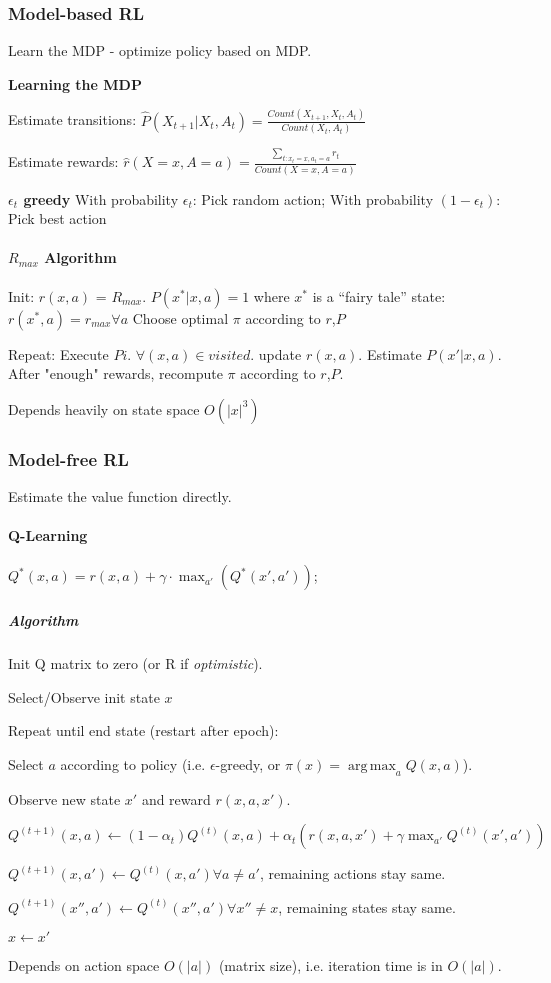 \documentclass[a4paper, 10pt]{scrartcl}
\DeclareMathOperator*{\argmax}{arg\,max}
\begin{document}
\begin{multicols*}{3}
\subsubsection{Model-based RL }
Learn the MDP - optimize policy based on MDP.

\textbf{Learning the MDP}

Estimate transitions: $\hat{P}(X_{t+1} | X_t, A_t) = \frac{Count(X_{t+1}, X_t, A_t)}{Count(X_t, A_t)}$

Estimate rewards: $\hat{r}(X=x, A= a) = \frac{\sum_{t: x_t = x, a_t = a} r_t}{Count(X = x, A = a)}$

\textbf{ $\epsilon_t$ greedy}
With probability  $\epsilon_t$: Pick random action; With probability $(1- \epsilon_t)$: Pick best action

\paragraph{$R_{max}$ Algorithm}
Init: $r(x, a)$ = $R_{max}$.
$P(x^* | x, a) = 1$ where $x^*$ is a “fairy tale” state: $r(x^*, a) = r_{max}  \forall a$
Choose optimal $\pi$ according to $r$,$P$

Repeat:
Execute $Pi$. $\forall(x,a)\in visited$. update $r(x,a)$. Estimate $P(x'|x,a)$.
After "enough" rewards, recompute $\pi$ according to $r$,$P$.

Depends heavily on state space $O(|x|^3)$


\subsubsection{Model-free RL}
Estimate the value function directly.

\paragraph{Q-Learning}
$Q^*(x, a) = r(x, a) + \gamma \cdot \max_{a'} (Q^*(x', a'))$;

\subparagraph{Algorithm} Init Q matrix to zero (or R if \emph{optimistic}).
\begin{compactitem}
	\item Select/Observe init state $x$
	\item Repeat until end state (restart after epoch):
	\item Select $a$ according to policy (i.e. $\epsilon$-greedy, or $\pi(x) = \argmax_a Q(x, a)$).
	\item Observe new state $x'$ and reward $r(x,a,x')$.
	\item $Q^{(t+1)}(x, a) \leftarrow (1-\alpha_t)Q^{(t)}(x, a) + \alpha_t(r(x,a,x') + \gamma \max_{a'}Q^{(t)}(x',a'))$
	\item $Q^{(t+1)}(x, a') \leftarrow Q^{(t)}(x, a') \forall a \neq a'$, remaining actions stay same.
	\item $Q^{(t+1)}(x'', a') \leftarrow Q^{(t)}(x'', a') \forall x'' \neq x$, remaining states stay same.
	\item $x \leftarrow x'$
\end{compactitem}

Depends on action space $O(|a|)$ (matrix size), i.e. iteration time is in $O(|a|)$.

\end{multicols*}
\end{document}
